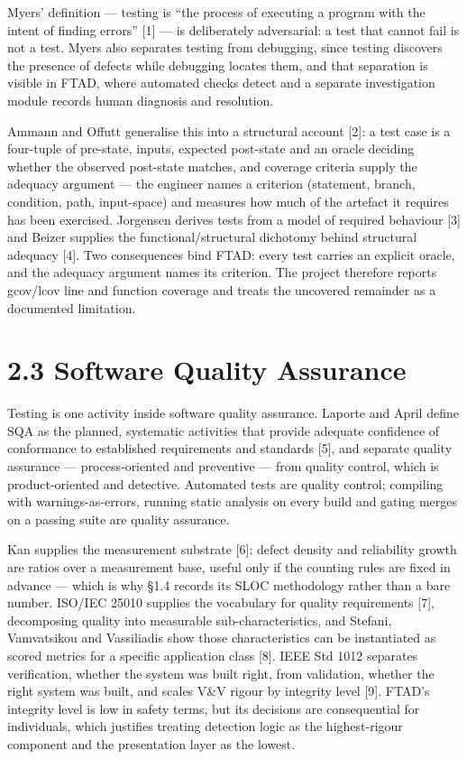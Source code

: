 \documentclass[
  12pt,
]{report}
\begin{document}
Myers' definition --- testing is ``the process of executing a program
with the intent of finding errors'' {[}1{]} --- is deliberately
adversarial: a test that cannot fail is not a test. Myers also separates
testing from debugging, since testing discovers the presence of defects
while debugging locates them, and that separation is visible in FTAD,
where automated checks detect and a separate investigation module
records human diagnosis and resolution.

Ammann and Offutt generalise this into a structural account {[}2{]}: a
test case is a four-tuple of pre-state, inputs, expected post-state and
an oracle deciding whether the observed post-state matches, and coverage
criteria supply the adequacy argument --- the engineer names a criterion
(statement, branch, condition, path, input-space) and measures how much
of the artefact it requires has been exercised. Jorgensen derives tests
from a model of required behaviour {[}3{]} and Beizer supplies the
functional/structural dichotomy behind structural adequacy {[}4{]}. Two
consequences bind FTAD: every test carries an explicit oracle, and the
adequacy argument names its criterion. The project therefore reports
gcov/lcov line and function coverage and treats the uncovered remainder
as a documented limitation.

\section{2.3 Software Quality
Assurance}\label{software-quality-assurance}

Testing is one activity inside software quality assurance. Laporte and
April define SQA as the planned, systematic activities that provide
adequate confidence of conformance to established requirements and
standards {[}5{]}, and separate quality assurance --- process-oriented
and preventive --- from quality control, which is product-oriented and
detective. Automated tests are quality control; compiling with
warnings-as-errors, running static analysis on every build and gating
merges on a passing suite are quality assurance.

Kan supplies the measurement substrate {[}6{]}: defect density and
reliability growth are ratios over a measurement base, useful only if
the counting rules are fixed in advance --- which is why §1.4 records
its SLOC methodology rather than a bare number. ISO/IEC 25010 supplies
the vocabulary for quality requirements {[}7{]}, decomposing quality
into measurable sub-characteristics, and Stefani, Vamvatsikou and
Vassiliadis show those characteristics can be instantiated as scored
metrics for a specific application class {[}8{]}. IEEE Std 1012
separates verification, whether the system was built right, from
validation, whether the right system was built, and scales V\&V rigour
by integrity level {[}9{]}. FTAD's integrity level is low in safety
terms, but its decisions are consequential for individuals, which
justifies treating detection logic as the highest-rigour component and
the presentation layer as the lowest.
\end{document}

